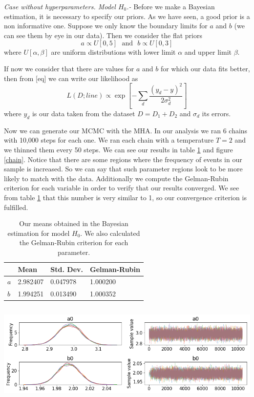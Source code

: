 \documentclass[onecolumn,           %
               showpacs,            %
               preprintnumbers,     %
               aps,                 %
               prl,          	    %
               letterpaper,             %
               superscriptaddress,      %
               nofootinbib,         %
               tightenlines,        %
               floats,floatfix      %
               ,usenatbib,
               ]{revtex4-1}
\begin{document}
\textit{Case without hyperparameters. Model $H_0$.-} Before we make a Bayesian estimation, it is necessary to specify our priors. As we have seen, a good prior is a non informative one. Suppose we only know the boundary limits for $a$ and $b$ (we can see them by eye in our data). Then we consider the flat priors
\begin{equation}
a \propto U[0,5] \ \ \ \text{and} \ \ \ b \propto U[0,3]
\end{equation}
where $U[\alpha,\beta]$ are uniform distributions with lower limit $\alpha$ and upper limit $\beta$.

If now we consider that there are values for $a$ and $b$ for which our data fits better, then from [eq] we can write our likelihood as
\begin{equation}
L(D;line)\propto \exp\left[-\sum_d \frac{(y_d-y)^2}{2\sigma_d^2}\right]
\end{equation}
where $y_d$ is our data taken from the dataset $D=D_1+D_2$ and $\sigma_d$ its errors.

Now we can generate our MCMC with the MHA. In our analysis we ran 6 chains with 10,000 steps for each one. We ran each chain with a temperature $T=2$ and we thinned them every 50 steps. We can see our results in table \ref{tabla1} and figure \ref{chain}. Notice that there are some regions where the frequency of events in our sample is increased. So we can say that such parameter regions look to be more likely to match with the data. Additionally we compute the Gelman-Rubin criterion for each variable in order to verify that our results converged. We see from table \ref{tabla1} that this number is very similar to 1, so our convergence criterion is fulfilled.

\begin{table}[h!]
\centering
\begin{tabular}{||l|l|l|l||} 
 \hline
 & \textbf{Mean} & \textbf{Std. Dev.} & \textbf{Gelman-Rubin} \\ [0.5ex] 
 \hline\hline
$a$ & 2.982407 & 0.047978 & 1.000200 \\
\hline
$b$ & 1.994251 & 0.013490 & 1.000352\\ [1ex] 
 \hline
\end{tabular}
\caption{\footnotesize{Our means obtained in the Bayesian estimation for model $H_0$. We also calculated the Gelman-Rubin criterion for each parameter.}}
\label{tabla1}
\end{table}

\begin{minipage}{\textwidth}
\centering
\includegraphics[height=5cm]{Figures/chain_new.png}
\label{chain}
\end{minipage}
\end{document}
